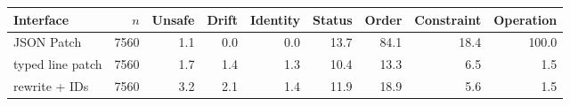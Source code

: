\begin{tabular}{lrrrrrrrr}
\toprule
Interface & $n$ & Unsafe & Drift & Identity & Status & Order & Constraint & Operation \\
\midrule
JSON Patch & 7560 & 1.1 & 0.0 & 0.0 & 13.7 & 84.1 & 18.4 & 100.0 \\
typed line patch & 7560 & 1.7 & 1.4 & 1.3 & 10.4 & 13.3 & 6.5 & 1.5 \\
rewrite + IDs & 7560 & 3.2 & 2.1 & 1.4 & 11.9 & 18.9 & 5.6 & 1.5 \\
\bottomrule
\end{tabular}
